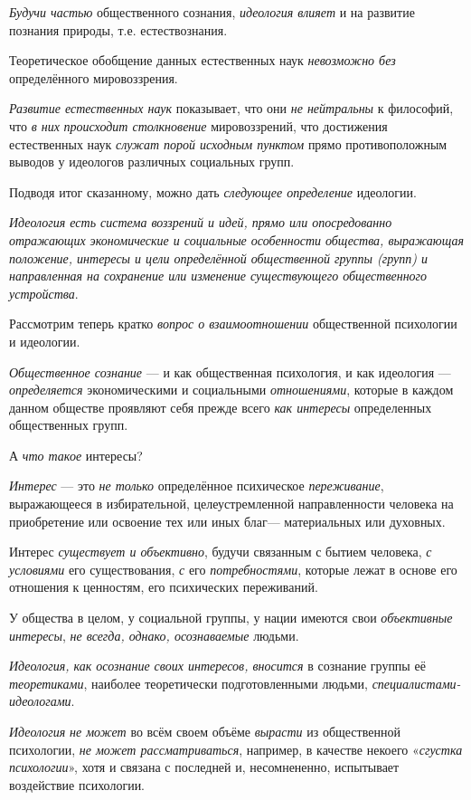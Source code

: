 \documentclass[a4paper,14pt,russian]{extreport}
\begin{document}
\emph{Будучи частью} общественного сознания, \emph{идеология влияет} и на развитие познания природы, т.е. естествознания.

Теоретическое обобщение данных естественных наук \emph{невозможно без} определённого мировоззрения.

\emph{Развитие естественных наук} показывает, что они \emph{не нейтральны} к философий, что \emph{в них} \emph{происходит столкновение} мировоззрений, что достижения естественных наук \emph{служат порой исходным пунктом} прямо противоположным выводов у идеологов различных социальных групп.

Подводя итог сказанному, можно дать \emph{следующее определение} идеологии.

\emph{Идеология есть система воззрений и идей, прямо или опосредованно отражающих экономические и социальные особенности общества, выражающая положение, интересы и цели определённой общественной группы (групп) и направленная на сохранение или изменение существующего общественного устройства}.

Рассмотрим теперь кратко \emph{вопрос о взаимоотношении} общественной психологии и идеологии.

\emph{Общественное сознание} --- и как общественная психология, и как идеология --- \emph{определяется} экономическими и социальными \emph{отношениями}, которые в каждом данном обществе проявляют себя прежде всего \emph{как интересы} определенных общественных групп.

А \emph{что такое} интересы?

\emph{Интерес} --- это \emph{не только} определённое психическое \emph{переживание}, выражающееся в избирательной, целеустремленной направленности человека на приобретение или освоение тех или иных благ--- материальных или духовных.

Интерес \emph{существует и объективно}, будучи связанным с бытием человека, \emph{с условиями} его существования, \emph{с} его \emph{потребностями}, которые лежат в основе его отношения к ценностям, его психических переживаний.

У общества в целом, у социальной группы, у нации имеются свои \emph{объективные интересы}, \emph{не всегда, однако, осознаваемые} людьми.

\emph{Идеология, как осознание своих интересов, вносится} в сознание группы её \emph{теоретиками}, наиболее теоретически подготовленными людьми, \emph{специалистами-идеологами}.

\emph{Идеология} \emph{не может} во всём своем объёме \emph{вырасти} из общественной психологии, \emph{не может рассматриваться}, например, в качестве некоего «\emph{сгустка психологии}», хотя и связана с последней и, несомнененно, испытывает воздействие психологии.
\end{document}
